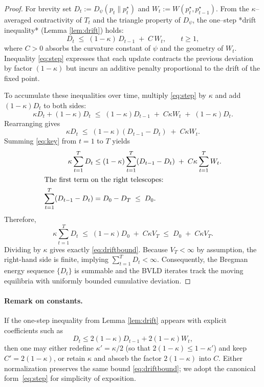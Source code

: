 \documentclass[11pt]{article}
\theoremstyle{plain}
\theoremstyle{definition}
\theoremstyle{remark}
\begin{document}
\begin{proof}
For brevity set $D_t:=D_\psi(p_t\|p_t^\star)$ and
$W_t:=W(p_t^\star,p_{t-1}^\star)$.
From the $\kappa$–averaged contractivity of $T_t$
and the triangle property of $D_\psi$,
the one–step *drift inequality* (Lemma \ref{lem:drift}) holds:
\begin{equation}
D_t
\;\le\;
(1-\kappa)\,D_{t-1}
\;+\;
C\,W_t,
\qquad t\ge1,
\label{eq:step}
\end{equation}
where $C>0$ absorbs the curvature constant of $\psi$
and the geometry of $W_t$.
Inequality \eqref{eq:step} expresses that each update contracts
the previous deviation by factor $(1-\kappa)$
but incurs an additive penalty proportional to the drift of the fixed point.

To accumulate these inequalities over time,
multiply \eqref{eq:step} by $\kappa$ and add $(1-\kappa)D_t$ to both sides:
\[
\kappa D_t+(1-\kappa)D_t
\;\le\;
(1-\kappa)D_{t-1}
\;+\;
C\kappa W_t
\;+\;
(1-\kappa)D_t.
\]
Rearranging gives
\begin{equation}
\kappa D_t
\;\le\;
(1-\kappa)(D_{t-1}-D_t)
\;+\;
C\kappa W_t.
\label{eq:key}
\end{equation}
Summing \eqref{eq:key} from $t=1$ to $T$ yields
\begin{align*}
\kappa\sum_{t=1}^T D_t
&\le
(1-\kappa)\sum_{t=1}^T(D_{t-1}-D_t)
\;+\;
C\kappa\sum_{t=1}^T W_t. \\
\intertext{The first term on the right telescopes:}
\sum_{t=1}^T(D_{t-1}-D_t)
&=D_0-D_T
\;\le\;D_0.
\end{align*}
Therefore,
\[
\kappa\sum_{t=1}^T D_t
\;\le\;
(1-\kappa)D_0
\;+\;
C\kappa V_T
\;\le\;
D_0
\;+\;
C\kappa V_T.
\]
Dividing by $\kappa$ gives exactly
\eqref{eq:driftbound}.
Because $V_T<\infty$ by assumption,
the right-hand side is finite, implying
$\sum_{t=1}^T D_t<\infty$.
Consequently,
the Bregman energy sequence $\{D_t\}$ is summable
and the BVLD iterates track the moving equilibria
with uniformly bounded cumulative deviation.
\end{proof}

\paragraph{Remark on constants.}
If the one-step inequality from Lemma \ref{lem:drift}
appears with explicit coefficients such as
\[
D_t \le 2(1-\kappa)D_{t-1}+2(1-\kappa)W_t,
\]
then one may either redefine $\kappa'=\kappa/2$
(so that $2(1-\kappa)\le1-\kappa'$)
and keep $C'=2(1-\kappa)$,
or retain $\kappa$ and absorb the factor $2(1-\kappa)$ into $C$.
Either normalization preserves the same bound
\eqref{eq:driftbound};
we adopt the canonical form~\eqref{eq:step}
for simplicity of exposition.
\end{document}
